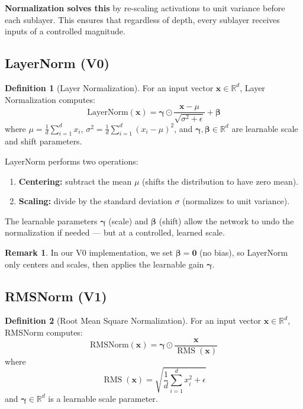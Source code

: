 \documentclass[11pt, a4paper]{article}
\theoremstyle{definition}
\newtheorem{definition}{Definition}[section]
\newtheorem{remark}{Remark}[section]
\newcommand{\vx}{\bm{x}}
\newcommand{\reals}{\mathbb{R}}
\DeclareMathOperator{\RMS}{RMS}
\begin{document}
\textbf{Normalization solves this} by re-scaling activations to unit variance before each sublayer. This ensures that regardless of depth, every sublayer receives inputs of a controlled magnitude.

\subsection{LayerNorm (V0)}

\begin{definition}[Layer Normalization]
For an input vector $\vx \in \reals^d$, Layer Normalization computes:
\begin{equation}\label{eq:layernorm}
    \mathrm{LayerNorm}(\vx) = \bm{\gamma} \odot \frac{\vx - \mu}{\sqrt{\sigma^2 + \epsilon}} + \bm{\beta}
\end{equation}
where $\mu = \frac{1}{d}\sum_{i=1}^d x_i$, \quad $\sigma^2 = \frac{1}{d}\sum_{i=1}^d (x_i - \mu)^2$, \quad and $\bm{\gamma}, \bm{\beta} \in \reals^d$ are learnable scale and shift parameters.
\end{definition}

LayerNorm performs two operations:
\begin{enumerate}
    \item \textbf{Centering:} subtract the mean $\mu$ (shifts the distribution to have zero mean).
    \item \textbf{Scaling:} divide by the standard deviation $\sigma$ (normalizes to unit variance).
\end{enumerate}
The learnable parameters $\bm{\gamma}$ (scale) and $\bm{\beta}$ (shift) allow the network to undo the normalization if needed — but at a controlled, learned scale.

\begin{remark}
In our V0 implementation, we set $\bm{\beta} = \bm{0}$ (no bias), so LayerNorm only centers and scales, then applies the learnable gain $\bm{\gamma}$.
\end{remark}

\subsection{RMSNorm (V1)}

\begin{definition}[Root Mean Square Normalization]
For an input vector $\vx \in \reals^d$, RMSNorm computes:
\begin{equation}\label{eq:rmsnorm}
    \mathrm{RMSNorm}(\vx) = \bm{\gamma} \odot \frac{\vx}{\RMS(\vx)}
\end{equation}
where
\begin{equation}
    \RMS(\vx) = \sqrt{\frac{1}{d}\sum_{i=1}^d x_i^2 + \epsilon}
\end{equation}
and $\bm{\gamma} \in \reals^d$ is a learnable scale parameter.
\end{definition}
\end{document}
